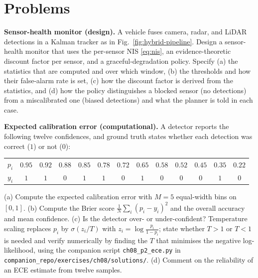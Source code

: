 \documentclass[graybox,envcountchap]{style/SNmono}
\newcommand{\problemsection}{\section*{Problems}\addcontentsline{toc}{section}{Problems}}
\newcommand{\repopath}[1]{\texttt{#1}}
\begin{document}
\problemsection

\begin{prob}\label{prob:ch08:1}
\textbf{Sensor-health monitor (design).} A vehicle fuses camera, radar, and LiDAR detections in a Kalman tracker as in Fig.~\ref{fig:hybrid-pipeline}. Design a sensor-health monitor that uses the per-sensor NIS \eqref{eq:nis}, an evidence-theoretic discount factor per sensor, and a graceful-degradation policy. Specify (a) the statistics that are computed and over which window, (b) the thresholds and how their false-alarm rate is set, (c) how the discount factor is derived from the statistics, and (d) how the policy distinguishes a blocked sensor (no detections) from a miscalibrated one (biased detections) and what the planner is told in each case.
\end{prob}

\begin{prob}\label{prob:ch08:2}
\textbf{Expected calibration error (computational).} A detector reports the following twelve confidences, and ground truth states whether each detection was correct ($1$) or not ($0$):
\begin{center}\scriptsize
\setlength{\tabcolsep}{3.5pt}
\begin{tabular}{l*{12}{c}}
\toprule
$p_i$ & $0.95$ & $0.92$ & $0.88$ & $0.85$ & $0.78$ & $0.72$ & $0.65$ & $0.58$ & $0.52$ & $0.45$ & $0.35$ & $0.22$ \\
$y_i$ & $1$ & $1$ & $0$ & $1$ & $1$ & $0$ & $1$ & $0$ & $0$ & $0$ & $1$ & $0$ \\
\bottomrule
\end{tabular}
\end{center}
(a) Compute the expected calibration error with $M=5$ equal-width bins on $[0,1]$. (b) Compute the Brier score $\frac{1}{N}\sum_i(p_i-y_i)^2$ and the overall accuracy and mean confidence. (c) Is the detector over- or under-confident? Temperature scaling replaces $p_i$ by $\sigma(z_i/T)$ with $z_i=\log\frac{p_i}{1-p_i}$; state whether $T>1$ or $T<1$ is needed and verify numerically by finding the $T$ that minimises the negative log-likelihood, using the companion script \repopath{ch08\_\allowbreak p2\_\allowbreak ece.py} in \repopath{companion\_\allowbreak repo/\allowbreak exercises/\allowbreak ch08/\allowbreak solutions/\allowbreak }. (d) Comment on the reliability of an ECE estimate from twelve samples.
\end{prob}
\end{document}
